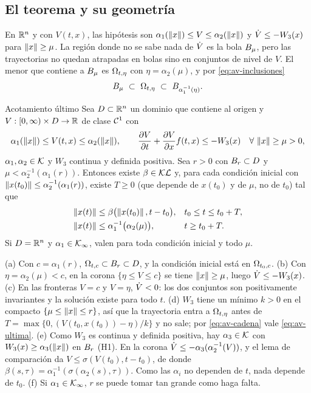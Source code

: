\subsection{El teorema y su geometría}

En $\mathbb{R}^n$ y con $V(t,x)$, las hipótesis son $\alpha_1(\left\lVert x\right\rVert)\le V\le\alpha_2(\left\lVert x\right\rVert)$ y $\dot V\le-W_3(x)$ para $\left\lVert x\right\rVert\ge\mu$. La región donde no se sabe nada de $\dot V$ es la bola $B_{\mu}$, pero las trayectorias no quedan atrapadas en bolas sino en conjuntos de nivel de $V$. El menor que contiene a $B_{\mu}$ es $\Omega_{t,\eta}$ con $\eta=\alpha_2(\mu)$, y por \eqref{eq:av-inclusiones}
\begin{equation}
  \Bola\mu\ \subset\ \Nivel{t,\eta}\ \subset\ \Bola{\alpha_1^{-1}(\eta)} .
  \label{eq:av-cadena}
\end{equation}

\begin{teorema}[label=thm:av-uub]{Acotamiento último \citep[Teo.~4.18]{Kha02}}
Sea $D\subset\mathbb{R}^n$ un dominio que contiene al origen y $V:[0,\infty)\times D\to\mathbb{R}$ de clase $\mathcal{C}^{1}$ con
\[
  \alpha_1(\left\lVert x\right\rVert)\le V(t,x)\le\alpha_2(\left\lVert x\right\rVert),\qquad \frac{\partial V}{\partial t}+\frac{\partial V}{\partial x}f(t,x)\le-W_3(x)\quad\forall\,\left\lVert x\right\rVert\ge\mu>0,
\]
$\alpha_1,\alpha_2\in\mathcal{K}$ y $W_3$ continua y definida positiva. Sea $r>0$ con $B_{r}\subset D$ y $\mu<\alpha_2^{-1}(\alpha_1(r))$. Entonces existe $\beta\in\mathcal{KL}$ y, para cada condición inicial con $\left\lVert x(t_0)\right\rVert\le\alpha_2^{-1}(\alpha_1(r))$, existe $T\ge0$ (que depende de $x(t_0)$ y de $\mu$, no de $t_0$) tal que
\begin{align}
  \left\lVert x(t)\right\rVert&\le\beta\bigl(\left\lVert x(t_0)\right\rVert,t-t_0\bigr), && t_0\le t\le t_0+T, \label{eq:av-transitorio}\\
  \left\lVert x(t)\right\rVert&\le\alpha_1^{-1}\bigl(\alpha_2(\mu)\bigr), && t\ge t_0+T. \label{eq:av-ultima}
\end{align}
Si $D=\mathbb{R}^n$ y $\alpha_1\in\mathcal{K}_{\infty}$, valen para toda condición inicial y todo $\mu$.
\end{teorema}

\begin{demostracion}
(a) Con $c=\alpha_1(r)$, $\Omega_{t,c}\subset B_{r}\subset D$, y la condición inicial está en $\Omega_{t_0,c}$. (b) Con $\eta=\alpha_2(\mu)<c$, en la corona $\{\eta\le V\le c\}$ se tiene $\left\lVert x\right\rVert\ge\mu$, luego $\dot V\le-W_3(x)$. (c) En las fronteras $V=c$ y $V=\eta$, $\dot V<0$: los dos conjuntos son positivamente invariantes y la solución existe para todo $t$. (d) $W_3$ tiene un mínimo $k>0$ en el compacto $\{\mu\le\left\lVert x\right\rVert\le r\}$, así que la trayectoria entra a $\Omega_{t,\eta}$ antes de $T=\max\{0,(V(t_0,x(t_0))-\eta)/k\}$ y no sale; por \eqref{eq:av-cadena} vale \eqref{eq:av-ultima}. (e) Como $W_3$ es continua y definida positiva, hay $\alpha_3\in\mathcal{K}$ con $W_3(x)\ge\alpha_3(\left\lVert x\right\rVert)$ en $B_{r}$ (H1). En la corona $\dot V\le-\alpha_3(\alpha_2^{-1}(V))$, y el lema de comparación da $V\le\sigma(V(t_0),t-t_0)$, de donde $\beta(s,\tau)=\alpha_1^{-1}(\sigma(\alpha_2(s),\tau))$. Como las $\alpha_i$ no dependen de $t$, nada depende de $t_0$. (f) Si $\alpha_1\in\mathcal{K}_{\infty}$, $r$ se puede tomar tan grande como haga falta.
\end{demostracion}

